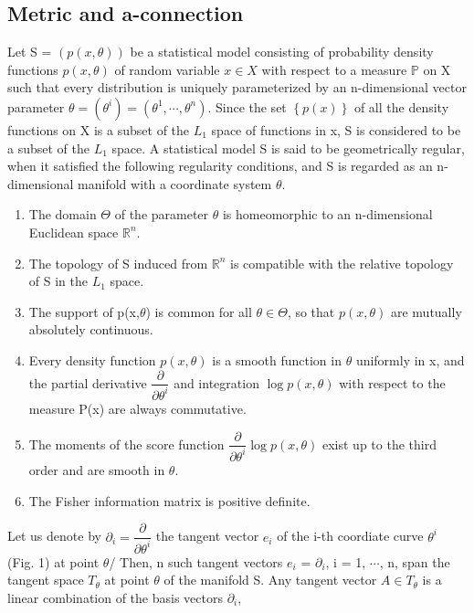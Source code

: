 \subsection{Metric and a-connection}
    Let S = $(p(x,\theta))$ be a statistical model consisting of probability density functions $p(x,\theta)$ of random 
    variable $x \in X$ with respect to a measure $\mathbb{P}$ on X such that every distribution is uniquely 
    parameterized
    by an n-dimensional vector parameter $\theta = (\theta^{i}) = (\theta^1,\cdots,\theta^n)$. Since the set 
    $\left\lbrace p(x)\right\rbrace$ of all the density functions on X is a subset of the $L_{1}$ space of functions in x, 
    S is considered
    to be a subset of the $L_{1}$ space. A statistical model S is said to be geometrically regular, when it satisfied
    the following regularity conditions, and S is regarded as an n-dimensional manifold with a
    coordinate system $\theta$.
    \begin{enumerate}
     \item The domain $\Theta$ of the parameter $\theta$ is homeomorphic to an n-dimensional Euclidean space 
     $\mathbb{R}^{n}$.
     \item The topology of S induced from $\mathbb{R}^{n}$ is compatible with the relative topology of S in 
     the $L_{1}$ space.
     \item The support of p(x,$\theta$) is common for all $\theta \in \Theta$, so that $p(x,\theta)$ are mutually absolutely
     continuous.
     \item Every density function $p(x,\theta)$ is a smooth function in $\theta$ uniformly in x, and the partial derivative
     $\dfrac{\partial}{\partial \theta^{i}}$ and integration $\log p(x, \theta)$ with respect to the measure P(x) are
     always commutative.
     \item The moments of the score function $\dfrac{\partial}{\partial \theta^{i}}\log p(x,\theta)$ exist up to the third
     order and are smooth in $\theta$.
     \item The Fisher information matrix is positive definite. 
    \end{enumerate}
Let us denote by $\partial_{i}  = \dfrac{\partial}{\partial \theta^{i}}$ the tangent vector $e_{i}$ of the i-th 
coordiate curve $\theta^{i}$ (Fig. 1) at point $\theta$/ Then, n such tangent vectors $e_{i}$ = $\partial_{i}$, 
i = 1, $\cdots$, n, span the tangent space $T_{\theta}$ at point $\theta$ of the manifold S. Any tangent vector 
$A \in T_{\theta}$ is a linear combination of the basis vectors $\partial_{i}$,

